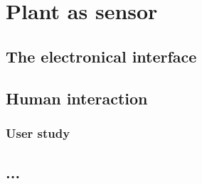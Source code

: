 \section{Plant as sensor}

\subsection{The electronical interface}

\subsection{Human interaction}
\subsubsection{}
\subsubsection{User study}
\subsection{...}
